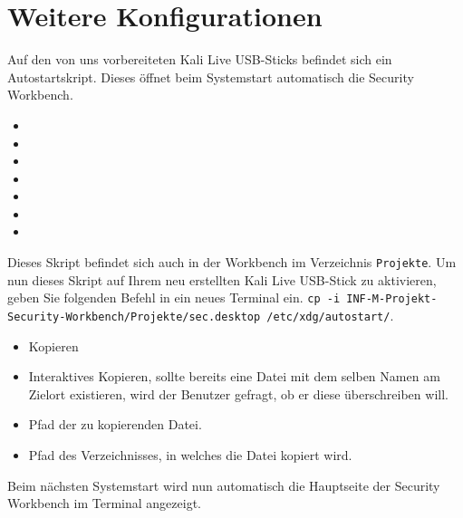 \section{Weitere Konfigurationen}
Auf den von uns vorbereiteten Kali Live USB-Sticks befindet sich ein Autostartskript.  Dieses öffnet beim Systemstart automatisch die Security Workbench.
\begin{itemize}
	\item {} 
	\item {} 
	\item {}
	\item {} 
	\item {} 
	\item {} 
	\item {} 
\end{itemize}
Dieses Skript befindet sich auch in der Workbench im Verzeichnis \colorbox{altgray}{\lstinline|Projekte|}.
Um nun dieses Skript auf Ihrem neu erstellten Kali Live USB-Stick zu aktivieren, geben Sie folgenden Befehl in ein neues Terminal ein.
\colorbox{altgray}{\lstinline|cp -i INF-M-Projekt-Security-Workbench/Projekte/sec.desktop /etc/xdg/autostart/|}.

\begin{itemize}
	\item {} Kopieren 
	\item {} Interaktives Kopieren, sollte bereits eine Datei mit dem selben Namen am Zielort existieren, wird der Benutzer gefragt, ob er diese überschreiben will. 
	\item {} Pfad der zu kopierenden Datei.
	\item {} Pfad des Verzeichnisses, in welches die Datei kopiert wird.
\end{itemize}
Beim nächsten Systemstart wird nun automatisch die Hauptseite der Security Workbench im Terminal angezeigt. 
